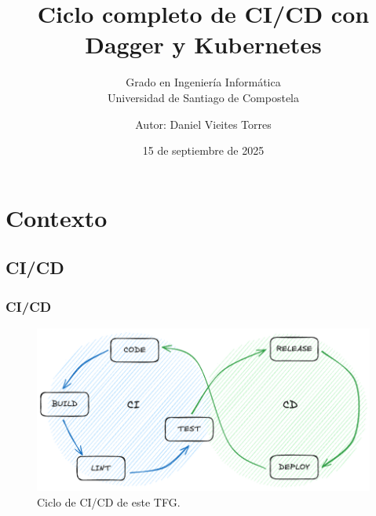 \documentclass{beamer}
\begin{document}
\title{Ciclo completo de CI/CD con Dagger y Kubernetes}
\subtitle{Grado en Ingeniería Informática \\
    Universidad de Santiago de Compostela}
\author{Autor: Daniel Vieites Torres}
\date{15 de septiembre de 2025}

\begin{frame}
    \titlepage
\end{frame}

\section{Contexto}

\subsection{CI/CD}
\begin{frame}
    \frametitle{CI/CD}
    \begin{figure}
        \includegraphics[scale=0.35]{figuras/ci_cd}
        \caption{Ciclo de CI/CD de este TFG.}
    \end{figure}
\end{frame}
\end{document}
